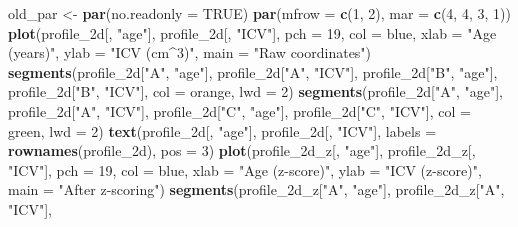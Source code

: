 \documentclass[
  english,
]{article}
\newenvironment{Shaded}{\begin{snugshade}}{\end{snugshade}}
\newcommand{\AttributeTok}[1]{\textcolor[rgb]{0.13,0.29,0.53}{#1}}
\newcommand{\ConstantTok}[1]{\textcolor[rgb]{0.56,0.35,0.01}{#1}}
\newcommand{\DecValTok}[1]{\textcolor[rgb]{0.00,0.00,0.81}{#1}}
\newcommand{\FunctionTok}[1]{\textcolor[rgb]{0.13,0.29,0.53}{\textbf{#1}}}
\newcommand{\NormalTok}[1]{#1}
\newcommand{\OtherTok}[1]{\textcolor[rgb]{0.56,0.35,0.01}{#1}}
\newcommand{\StringTok}[1]{\textcolor[rgb]{0.31,0.60,0.02}{#1}}
\begin{document}
\begin{Shaded}
\begin{Highlighting}[]
\NormalTok{old\_par }\OtherTok{\textless{}{-}} \FunctionTok{par}\NormalTok{(}\AttributeTok{no.readonly =} \ConstantTok{TRUE}\NormalTok{)}
\FunctionTok{par}\NormalTok{(}\AttributeTok{mfrow =} \FunctionTok{c}\NormalTok{(}\DecValTok{1}\NormalTok{, }\DecValTok{2}\NormalTok{), }\AttributeTok{mar =} \FunctionTok{c}\NormalTok{(}\DecValTok{4}\NormalTok{, }\DecValTok{4}\NormalTok{, }\DecValTok{3}\NormalTok{, }\DecValTok{1}\NormalTok{))}
\FunctionTok{plot}\NormalTok{(profile\_2d[, }\StringTok{"age"}\NormalTok{], profile\_2d[, }\StringTok{"ICV"}\NormalTok{], }\AttributeTok{pch =} \DecValTok{19}\NormalTok{, }\AttributeTok{col =}\NormalTok{ blue,}
     \AttributeTok{xlab =} \StringTok{"Age (years)"}\NormalTok{, }\AttributeTok{ylab =} \StringTok{"ICV (cm\^{}3)"}\NormalTok{, }\AttributeTok{main =} \StringTok{"Raw coordinates"}\NormalTok{)}
\FunctionTok{segments}\NormalTok{(profile\_2d[}\StringTok{"A"}\NormalTok{, }\StringTok{"age"}\NormalTok{], profile\_2d[}\StringTok{"A"}\NormalTok{, }\StringTok{"ICV"}\NormalTok{],}
\NormalTok{         profile\_2d[}\StringTok{"B"}\NormalTok{, }\StringTok{"age"}\NormalTok{], profile\_2d[}\StringTok{"B"}\NormalTok{, }\StringTok{"ICV"}\NormalTok{], }\AttributeTok{col =}\NormalTok{ orange, }\AttributeTok{lwd =} \DecValTok{2}\NormalTok{)}
\FunctionTok{segments}\NormalTok{(profile\_2d[}\StringTok{"A"}\NormalTok{, }\StringTok{"age"}\NormalTok{], profile\_2d[}\StringTok{"A"}\NormalTok{, }\StringTok{"ICV"}\NormalTok{],}
\NormalTok{         profile\_2d[}\StringTok{"C"}\NormalTok{, }\StringTok{"age"}\NormalTok{], profile\_2d[}\StringTok{"C"}\NormalTok{, }\StringTok{"ICV"}\NormalTok{], }\AttributeTok{col =}\NormalTok{ green, }\AttributeTok{lwd =} \DecValTok{2}\NormalTok{)}
\FunctionTok{text}\NormalTok{(profile\_2d[, }\StringTok{"age"}\NormalTok{], profile\_2d[, }\StringTok{"ICV"}\NormalTok{], }\AttributeTok{labels =} \FunctionTok{rownames}\NormalTok{(profile\_2d), }\AttributeTok{pos =} \DecValTok{3}\NormalTok{)}
\FunctionTok{plot}\NormalTok{(profile\_2d\_z[, }\StringTok{"age"}\NormalTok{], profile\_2d\_z[, }\StringTok{"ICV"}\NormalTok{], }\AttributeTok{pch =} \DecValTok{19}\NormalTok{, }\AttributeTok{col =}\NormalTok{ blue,}
     \AttributeTok{xlab =} \StringTok{"Age (z{-}score)"}\NormalTok{, }\AttributeTok{ylab =} \StringTok{"ICV (z{-}score)"}\NormalTok{, }\AttributeTok{main =} \StringTok{"After z{-}scoring"}\NormalTok{)}
\FunctionTok{segments}\NormalTok{(profile\_2d\_z[}\StringTok{"A"}\NormalTok{, }\StringTok{"age"}\NormalTok{], profile\_2d\_z[}\StringTok{"A"}\NormalTok{, }\StringTok{"ICV"}\NormalTok{],}

\end{Highlighting}
\end{Shaded}
\end{document}
